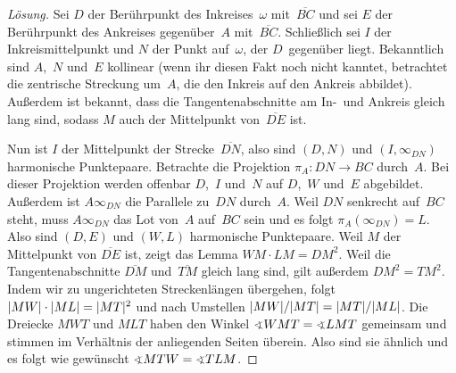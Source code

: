 \begin{figure}[ht]
\end{figure}

\begin{proof}[Lösung]
	Sei $D$ der Berührpunkt des Inkreises~$\omega$ mit~$\overline{BC}$ und sei $E$ der Berührpunkt des Ankreises gegenüber~$A$ mit~$\overline{BC}$. Schließlich sei $I$ der Inkreismittelpunkt und $N$ der Punkt auf~$\omega$, der $D$~gegenüber liegt. Bekanntlich sind $A$,~$N$ und~$E$ kollinear (wenn ihr diesen Fakt noch nicht kanntet, betrachtet die zentrische Streckung um~$A$, die den Inkreis auf den Ankreis abbildet). Außerdem ist bekannt, dass die Tangentenabschnitte am In-~und Ankreis gleich lang sind, sodass $M$ auch der Mittelpunkt von~$\overline{DE}$ ist.
	
	Nun ist $I$ der Mittelpunkt der Strecke~$\overline{DN}$, also sind $(D,N)$ und $(I,\infty_{DN})$ harmonische Punktepaare. Betrachte die Projektion $\pi_A\colon DN\to BC$ durch~$A$. Bei dieser Projektion werden offenbar $D$,~$I$ und~$N$ auf $D$,~$W$ und~$E$ abgebildet. Außerdem ist $A\infty_{DN}$ die Parallele zu~$DN$ durch~$A$. Weil $DN$ senkrecht auf~$BC$ steht, muss $A\infty_{DN}$ das Lot von~$A$ auf~$BC$ sein und es folgt $\pi_A(\infty_{DN})=L$. Also sind $(D,E)$ und $(W,L)$ harmonische Punktepaare. Weil $M$ der Mittelpunkt von $\overline{DE}$ ist, zeigt das Lemma $WM\cdot LM=DM^2$. Weil die Tangentenabschnitte $\overline{DM}$ und~$\overline{TM}$ gleich lang sind, gilt außerdem $DM^2=TM^2$. Indem wir zu ungerichteten Streckenlängen übergehen, folgt $\lvert MW\rvert\cdot\lvert ML\rvert=\lvert MT\rvert^2$ und nach Umstellen $\lvert MW\rvert/\lvert MT\rvert=\lvert MT\rvert/\lvert ML\rvert$. Die Dreiecke $MWT$ und $MLT$ haben den Winkel $\winkel WMT=\winkel LMT$ gemeinsam und stimmen im Verhältnis der anliegenden Seiten überein. Also sind sie ähnlich und es folgt wie gewünscht $\winkel MTW=\winkel TLM$.
\end{proof}

